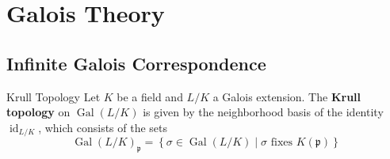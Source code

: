 \chapter{Galois Theory}

\section{Infinite Galois Correspondence}

\begin{definition}{Krull Topology}
  Let $K$ be a field and $L/K$ a Galois extension. The \textbf{Krull topology} on $\operatorname{Gal}(L/K)$ is given by the neighborhood basis of the identity $\operatorname{id}_{L/K}$, which consists of the sets
  \[
    \operatorname{Gal}(L/K)_{\mathfrak{p}} = \left\{\sigma \in \operatorname{Gal}(L/K) \mid \sigma\text{ fixes }K(\mathfrak{p})\right\}
  \]
    
\end{definition}